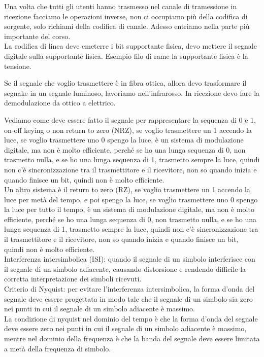 Una volta che tutti gli utenti hanno trasmesso nel canale di tramessione in ricezione 
facciamo le operazioni inverse, non ci occupiamo più della codifica di sorgente, 
solo richiami della codifica di canale. Adesso entriamo nella parte più importante del 
corso.\\

La codifica di linea deve emeterre i bit supportante fisica, devo mettere il segnale digitale
sulla supportante fisica. Esempio filo di rame la supportante fisica è la tensione.

Se il segnale che voglio trasmettere è in fibra ottica, allora devo trasformare il segnake
in un segnale luminoso, lavoriamo nell'infrarosso.
In ricezione devo fare la demodulazione da ottico a elettrico.

Vediamo come deve essere fatto il segnale per rappresentare la sequenza di 0 e 1, 
on-off keying o non return to zero (NRZ), se voglio trasmettere un 1 accendo la luce, se voglio 
trasmettere uno 0 spengo la luce, è un sistema di modulazione digitale, ma non è molto 
efficiente, perché se ho una lunga sequenza di 0, non trasmetto nulla, e se ho una 
lunga sequenza di 1, trasmetto sempre la luce, quindi non c'è sincronizzazione tra il 
trasmettitore e il ricevitore, non so quando inizia e quando finisce un bit, quindi 
non è molto efficiente.\\

Un altro sistema è il return to zero (RZ), se voglio trasmettere un 1 accendo la luce 
per metà del tempo, e poi spengo la luce, se voglio trasmettere uno 0 spengo la luce per
tutto il tempo, è un sistema di modulazione digitale, ma non è molto efficiente,
perché se ho una lunga sequenza di 0, non trasmetto nulla, e se ho una lunga sequenza di 
1, trasmetto sempre la luce, quindi non c'è sincronizzazione tra il trasmettitore e il
ricevitore, non so quando inizia e quando finisce un bit, quindi non è molto efficiente.\\

Interferenza intersimbolica (ISI): quando il segnale di un simbolo interferisce con il 
segnale di un simbolo adiacente, causando distorsione e rendendo difficile la corretta 
interpretazione dei simboli ricevuti.\\

Criterio di Nyquist: per evitare l'interferenza intersimbolica, la forma d'onda del 
segnale deve essere progettata in modo tale che il segnale di un simbolo sia zero 
nei punti in cui il segnale di un simbolo adiacente è massimo.\\
La condizione di nyquist nel dominio del tempo è che la forma d'onda del segnale deve
 essere zero nei punti in cui il segnale di un simbolo adiacente è massimo, mentre 
 nel dominio della frequenza è che la banda del segnale deve essere limitata a metà
 della frequenza di simbolo.\\


